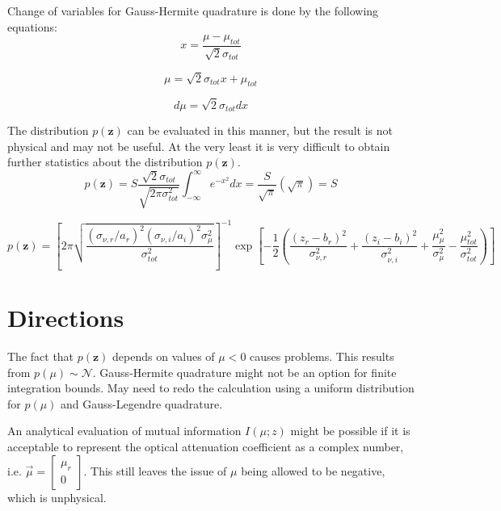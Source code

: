 \documentclass{article}         %
\theoremstyle{definition}
\theoremstyle{remark}
\begin{document}
Change of variables for Gauss-Hermite quadrature is done by the following equations:
\begin{equation}
	x = \frac{\mu - \mu_{tot}}{\sqrt{2}\sigma_{tot}}
\end{equation}

\begin{equation}
	\mu = \sqrt{2}\sigma_{tot}x + \mu_{tot}
\end{equation}

\begin{equation}
	d\mu = \sqrt{2}\sigma_{tot}dx
\end{equation}

The distribution $p\left(\mathbf{z}\right)$ can be evaluated in this manner, but the result is not physical and may not be useful. At the very least it is very difficult to obtain further statistics about the distribution $p\left(\mathbf{z}\right)$.
\begin{equation}
	p\left(\mathbf{z}\right) = S\frac{\sqrt{2}\sigma_{tot}}{\sqrt{2\pi\sigma_{tot}^2}}\int_{-\infty}^\infty e^{-x^2}dx = \frac{S}{\sqrt{\pi}}\left(\sqrt{\pi}\right) = S
\end{equation}

\begin{equation}
	p\left(\mathbf{z}\right) = \left[2\pi\sqrt{\frac{\left(\sigma_{\nu,r}/a_r\right)^2\left(\sigma_{\nu,i}/a_i\right)^2\sigma_\mu^2}{\sigma_{tot}^2}}\right]^{-1}\exp\left[-\frac{1}{2}\left(\frac{\left(z_r - b_r\right)^2}{\sigma_{\nu,r}^2} + \frac{\left(z_i - b_i\right)^2}{\sigma_{\nu,i}^2} + \frac{\mu_\mu^2}{\sigma_\mu^2} - \frac{\mu_{tot}^2}{\sigma_{tot}^2}\right)\right]
\end{equation}

\section{Directions}\label{Directions}

The fact that $p\left(\mathbf{z}\right)$ depends on values of $\mu < 0$ causes problems. This results from $p\left(\mu\right)\sim\mathcal{N}$. Gauss-Hermite quadrature might not be an option for finite integration bounds. May need to redo the calculation using a uniform distribution for $p\left(\mu\right)$ and Gauss-Legendre quadrature.

An analytical evaluation of mutual information $I\left(\mu;z\right)$ might be possible if it is acceptable to represent the optical attenuation coefficient as a complex number, i.e. $\vec{\mu} = \left[ \begin{array}{c} \mu_r \\ 0 \end{array} \right]$. This still leaves the issue of $\mu$ being allowed to be negative, which is unphysical.
\end{document}
